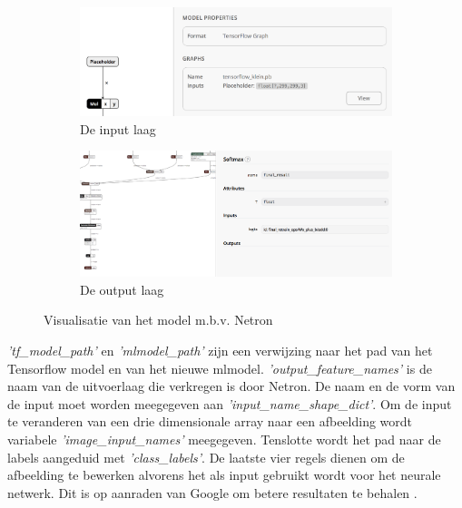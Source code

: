 \begin{figure}[!ht]
    \centering
    \begin{subfigure}{.5\textwidth}
      \centering
      \includegraphics[width=.95\linewidth]{img/input_netron.png}
      \caption{De input laag}
      \label{fig:sub1}
    \end{subfigure}%
    \begin{subfigure}{.5\textwidth}
      \centering
      \includegraphics[width=.95\linewidth]{img/output_netron.png}
      \caption{De output laag}
      \label{fig:sub2}
    \end{subfigure}
    \caption{Visualisatie van het model m.b.v. Netron }
    \label{fig:visualisatienetron}
\end{figure}

\newpage
{}

\textit{'tf\_model\_path'} en \textit{'mlmodel\_path'} zijn een verwijzing naar het pad van het Tensorflow model en van het nieuwe mlmodel. \textit{'output\_feature\_names'} is de naam van de uitvoerlaag die verkregen is door Netron. De naam en de vorm van de input moet worden meegegeven aan \textit{'input\_name\_shape\_dict'}. Om de input te veranderen van een drie dimensionale array naar een afbeelding wordt variabele \textit{'image\_input\_names'} meegegeven. Tenslotte wordt het pad naar de labels aangeduid met \textit{'class\_labels'}. De laatste vier regels dienen om de afbeelding te bewerken alvorens het als input gebruikt wordt voor het neurale netwerk. Dit is op aanraden van Google om betere resultaten te behalen \autocite{hackermoon2}. 

